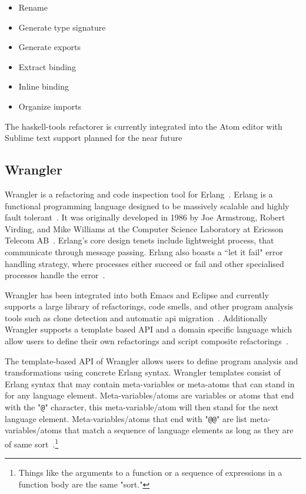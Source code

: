 \begin{itemize}
\item Rename
\item Generate type signature
\item Generate exports
\item Extract binding
\item Inline binding
\item Organize imports
\end{itemize}

The haskell-tools refactorer is currently integrated into the Atom editor with Sublime text support planned for the near future~\citep{haskellTools}

\subsection{Wrangler}

Wrangler is a refactoring and code inspection tool for Erlang~\citep{wrangler}. Erlang is a functional programming language designed to be massively scalable and highly fault tolerant~\cite{erlang}. It was originally developed in 1986 by Joe Armstrong, Robert Virding, and Mike Williams at the Computer Science Laboratory at Ericsson Telecom AB~\cite{erlangHistory}. Erlang's core design tenets include lightweight process, that communicate through message passing. Erlang also boasts a ``let it fail" error handling strategy, where processes either succeed or fail and other specialised processes handle the error~\cite{armstrongThesis}.

Wrangler has been integrated into both Emacs and Eclipse and currently supports a large library of refactorings, code smells, and other program analysis tools such as clone detection and automatic api migration~\citep{wrangler}. Additionally Wrangler supports a template based API and a domain specific language which allow users to define their own refactorings and script composite refactorings~\citep{wranglerDomain}.

The template-based API of Wrangler allows users to define program analysis and transformations using concrete Erlang syntax. Wrangler templates consist of Erlang syntax that may contain meta-variables or meta-atoms that can stand in for any language element. Meta-variables/atoms are variables or atoms that end with the "\texttt{@}" character, this meta-variable/atom will then stand for the next language element. Meta-variables/atoms that end with "\texttt{@@}" are list meta-variables/atoms that match a sequence of language elements as long as they are of same sort~\citep{letsUser}.\footnote{Things like the arguments to a function or a sequence of expressions in a function body are the same "sort."}

